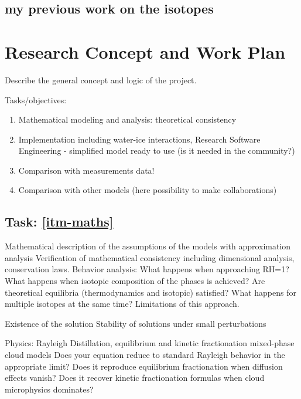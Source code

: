 \documentclass[11pt,a4paper]{article}
\begin{document}
\subsection{
my previous work on the isotopes
}




\section{Research Concept and Work Plan}

Describe the general concept and logic of the project.

Tasks/objectives: 
\begin{enumerate}
    \item\label{itm-maths} Mathematical modeling and analysis: theoretical consistency
    \item\label{itm-code} Implementation including water-ice interactions, Research Software Engineering
        - simplified model ready to use (is it needed in the community?)
    \item\label{itm-data} Comparison with measurements data!
    \item\label{itm-models} \color{red} Comparison with other models (here possibility to make collaborations)
\end{enumerate}

\subsection{Task: \ref{itm-maths}}
Mathematical description of the assumptions of the models with approximation analysis
Verification of mathematical consistency including dimensional analysis, conservation laws.
Behavior analysis: What happens when approaching RH=1?
What happens when isotopic composition of the phases is achieved?
Are theoretical equilibria (thermodynamics and isotopic) satisfied?
What happens for multiple isotopes at the same time?
Limitations of this approach.

Existence of the solution
Stability of solutions under small perturbations

Physics: Rayleigh Distillation, equilibrium and kinetic fractionation
mixed-phase cloud models
Does your equation reduce to standard Rayleigh behavior in the appropriate limit?
Does it reproduce equilibrium fractionation when diffusion effects vanish?
Does it recover kinetic fractionation formulas when cloud microphysics dominates?
\end{document}
